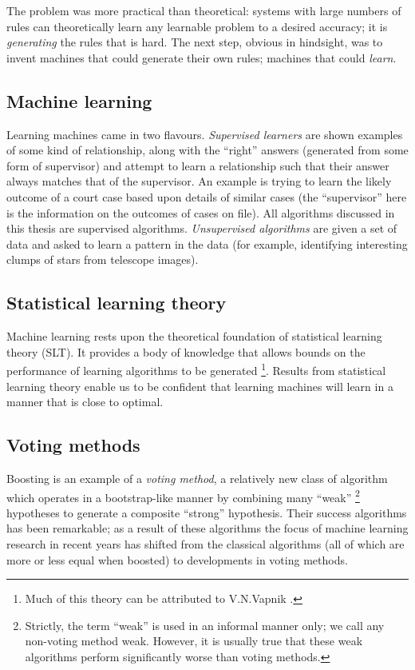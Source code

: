 The problem was more practical than theoretical: systems with large
numbers of rules can theoretically learn any learnable problem to a
desired accuracy; it is \emph{generating} the rules that is hard.  The
next step, obvious in hindsight, was to invent machines that could
generate their own rules; machines that could \emph{learn}.


\subsection{Machine learning}

Learning machines came in two flavours.  \emph{Supervised learners} are
shown examples of some kind of relationship, along with the ``right''
answers (generated from some form of supervisor) and attempt to learn a
relationship such that their answer always matches that of the
supervisor.  An example is trying to learn the likely outcome of a
court case based upon details of similar cases (the ``supervisor''
here is the information on the outcomes of cases on file).  All
algorithms discussed in this thesis are supervised algorithms.
\emph{Unsupervised algorithms} are given a set of data and asked to
learn a pattern in the data (for example, identifying interesting
clumps of stars from telescope images).


\subsection{Statistical learning theory}

Machine learning rests upon the theoretical foundation of statistical
learning theory (SLT).  It provides a body of knowledge that allows
bounds on the performance of learning algorithms to be generated%
\footnote{Much of this theory can be attributed to V.N.Vapnik
\cite{Vapnik98}.}.
Results from statistical learning theory enable us to be confident
that learning machines will learn in a manner that is close to optimal.

\subsection{Voting methods}

Boosting is an example of a \emph{voting method}, a relatively new
class of algorithm which operates in a bootstrap-like 
manner by combining many ``weak''%
\footnote{Strictly, the term ``weak'' is used in an informal manner
only; we call any non-voting method weak.  However, it is usually true
that these weak algorithms perform significantly worse than voting
methods.}
hypotheses to generate a composite ``strong'' hypothesis.  Their success
algorithms has been remarkable; as a result of these algorithms the
focus of machine learning research in recent years has shifted from
the classical algorithms (all of which are more or less equal when
boosted) to developments in voting methods.

